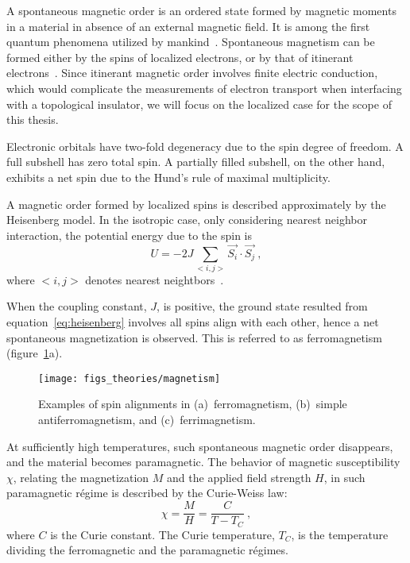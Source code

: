 A spontaneous magnetic order is an ordered state formed by magnetic moments in a material in absence of an external magnetic field. It is among the first quantum phenomena utilized by mankind~\cite{mag_history}. Spontaneous magnetism can be formed either by the spins of localized electrons, or by that of itinerant electrons~\cite{moriya1984}. Since itinerant magnetic order involves finite electric conduction, which would complicate the measurements of electron transport when interfacing with a topological insulator, we will focus on the localized case for the scope of this thesis.

Electronic orbitals have two-fold degeneracy due to the spin degree of freedom. A full subshell has zero total spin. A partially filled subshell, on the other hand, exhibits a net spin due to the Hund's rule of maximal multiplicity.

A magnetic order formed by localized spins is described approximately by the Heisenberg model. In the isotropic case, only considering nearest neighbor interaction, the potential energy due to the spin is%
\begin{equation}%
    U = -2J \sum_{<i, j>} \vec{S_i} \cdot \vec{S_j}~,\label{eq:heisenberg}%
\end{equation}%
where $<i, j>$ denotes nearest neightbors~\cite{kittel}.

When the coupling constant, $J$, is positive, the ground state resulted from equation~\ref{eq:heisenberg} involves all spins align with each other, hence a net spontaneous magnetization is observed. This is referred to as ferromagnetism (figure~\ref{fig:bg_mag}a). %
\begin{figure}[ht]%
    \centering%
    \texttt{[image: figs\_theories/magnetism]}%
    \caption[Spin alignments in ferromagnetism, antiferromagnetism, and ferrimagnetism]{\label{fig:bg_mag}Examples of spin alignments in (a)~ferromagnetism, (b)~simple antiferromagnetism, and (c)~ferrimagnetism.}%
\end{figure}%
%
At sufficiently high temperatures, such spontaneous magnetic order disappears, and the material becomes paramagnetic. The behavior of magnetic susceptibility $\chi$, relating the magnetization $M$ and the applied field strength $H$, in such paramagnetic r\'egime is described by the Curie-Weiss law:%
\begin{equation}%
    \chi = \frac{M}{H} = \frac{C}{T - T_C}~,\label{eq:curie_weiss}%
\end{equation}%
where $C$ is the Curie constant. The Curie temperature, $T_C$, is the temperature dividing the ferromagnetic and the paramagnetic r\'egimes.

